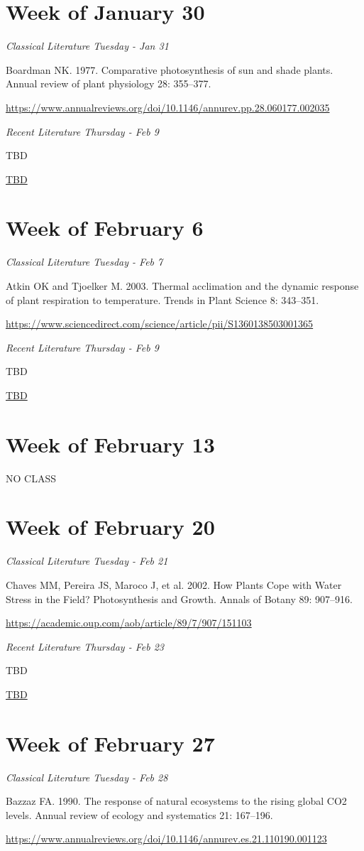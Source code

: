 \documentclass[12pt, notitlepage]{article}   	%
\begin{document}
{\section*{Week of January 30}
\textit{Classical Literature Tuesday - Jan 31} \par
Boardman NK. 1977. Comparative photosynthesis of sun and shade plants. 
Annual review of plant physiology 28: 355–377. \par
\url{https://www.annualreviews.org/doi/10.1146/annurev.pp.28.060177.002035}

\textit{Recent Literature Thursday - Feb 9} \par
TBD \par
\url{TBD}

\section*{Week of February 6}
\textit{Classical Literature Tuesday - Feb 7} \par
Atkin OK and Tjoelker M. 2003. Thermal acclimation and the dynamic response of plant 
respiration to temperature. Trends in Plant Science 8: 343–351. \par
\url{https://www.sciencedirect.com/science/article/pii/S1360138503001365}

\textit{Recent Literature Thursday - Feb 9} \par
TBD \par
\url{TBD}

\section*{Week of February 13}
NO CLASS

\section*{Week of February 20}
\textit{Classical Literature Tuesday - Feb 21} \par
Chaves MM, Pereira JS, Maroco J, et al. 2002. How Plants Cope with Water Stress 
in the Field? Photosynthesis and Growth. Annals of Botany 89: 907–916. \par
\url{https://academic.oup.com/aob/article/89/7/907/151103}

\textit{Recent Literature Thursday - Feb 23} \par
TBD \par
\url{TBD}

\section*{Week of February 27}
\textit{Classical Literature Tuesday - Feb 28} \par
Bazzaz FA. 1990. The response of natural ecosystems to the rising global CO2 levels. 
Annual review of ecology and systematics 21: 167–196. \par
\url{https://www.annualreviews.org/doi/10.1146/annurev.es.21.110190.001123}

}
\end{document}
